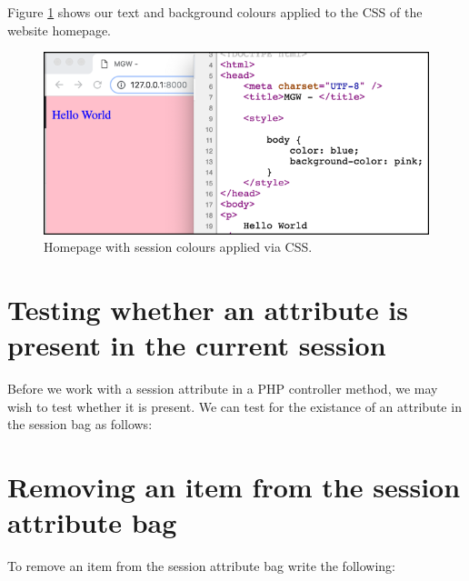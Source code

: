 \documentclass[a4paperpaper,openright]{book}
\newenvironment{Shaded}{}{}
\newcommand{\CommentTok}[1]{\textcolor[rgb]{0.38,0.63,0.69}{\textit{#1}}}
\newcommand{\KeywordTok}[1]{\textcolor[rgb]{0.00,0.44,0.13}{\textbf{#1}}}
\newcommand{\NormalTok}[1]{#1}
\newcommand{\OtherTok}[1]{\textcolor[rgb]{0.00,0.44,0.13}{#1}}
\newcommand{\StringTok}[1]{\textcolor[rgb]{0.25,0.44,0.63}{#1}}
\begin{document}
Figure \ref{colours_css_index} shows our text and background colours
applied to the CSS of the website homepage.

\begin{figure}
\centering
\includegraphics{./tex2pdf.-d01fd108a306454d/1aca0e32b45d577ec003c85e186871abd9ba9b56.png}
\caption{Homepage with session colours applied via CSS.
\label{colours_css_index}}
\end{figure}

\hypertarget{testing-whether-an-attribute-is-present-in-the-current-session}{%
\section{Testing whether an attribute is present in the current
session}\label{testing-whether-an-attribute-is-present-in-the-current-session}}

Before we work with a session attribute in a PHP controller method, we
may wish to test whether it is present. We can test for the existance of
an attribute in the session bag as follows:

\begin{Shaded}
\end{Shaded}

\hypertarget{removing-an-item-from-the-session-attribute-bag}{%
\section{Removing an item from the session attribute
bag}\label{removing-an-item-from-the-session-attribute-bag}}

To remove an item from the session attribute bag write the following:
\end{document}
